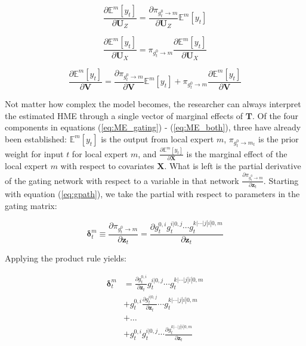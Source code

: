 \documentclass[12pt]{article}
\newcommand{\gateprod}[2]{\pi_{#1 \longrightarrow #2}}
\newcommand{\Eym}{\mathbb{E}^{m} \left[ y_{t} \right]}
\theoremstyle{definition}
\begin{document}
\begin{equation} \label{eq:ME_gating}
  \frac{\partial \Eym}{\partial \boldsymbol{U}_{Z}} = \frac{\partial \gateprod{g^{0}_{t}}{m}}{{\partial \boldsymbol{U}_{Z}}} \Eym
\end{equation}


\begin{equation} \label{eq:ME_expert}
  \frac{\partial \Eym}{\partial \boldsymbol{U}_{X}} = \gateprod{g^{0}_{t}}{m} \frac{\partial \Eym}{{\partial \boldsymbol{U}_{X}}}
\end{equation}


\begin{equation} \label{eq:ME_both}
  \frac{\partial \Eym}{\partial \boldsymbol{V}} = \frac{\partial \gateprod{g^{0}_{t}}{m}}{{\partial \boldsymbol{V}}} \Eym + \gateprod{g^{0}_{t}}{m} \frac{\partial \Eym}{{\partial \boldsymbol{V}}}
\end{equation}

Not matter how complex the model becomes, the researcher can always interpret
the estimated HME through a single vector of marginal effects of $\boldsymbol{T}$.
Of the four components in equations (\ref{eq:ME_gating}) - (\ref{eq:ME_both}),
three have already been established: $\Eym$ is the output from local
expert $m$, $\gateprod{g^{0}_{t}}{m_{t}}$ is the prior weight for
input $t$ for local expert $m$, and $\frac{\partial \Eym}{{\partial \boldsymbol{X}}}$
is the marginal effect of the local expert $m$ with respect to covariates $\boldsymbol{X}$.
What is left is the partial derivative of the gating network with respect to a
variable in that network $\frac{\partial \gateprod{g^{0}_{t}}{m}}{\partial \boldsymbol{z}_{t}}$.
Starting with equation (\ref{eq:gpath}), we take the partial with
respect to parameters in the gating matrix:

\begin{equation} \label{eq:hme_gate_marginal_effect_1}
  \boldsymbol{\delta}^{m}_{t} \equiv \frac{\partial \gateprod{g^{0}_{t}}{m}}{\partial \boldsymbol{z}_{t}} = \frac{\partial g^{0, i}_{t} g^{i|0, j}_{t} \cdots g^{k|\cdots|j|i|0, m}_{t}}{\partial \boldsymbol{z}_{t}}
\end{equation}

Applying the product rule yields:

\begin{equation} \label{eq:hme_gate_marginal_effect_2}
  \begin{split}
    \boldsymbol{\delta}^{m}_{t} &= \frac{\partial g^{0, i}_{t}}{\partial \boldsymbol{z}_{t}} g^{i|0, j}_{t} \cdots g^{k|\cdots|j|i|0, m}_{t}                       \\
                                     &+ g^{0, i}_{t} \frac{\partial g^{i|0, j}_{t}}{\partial \boldsymbol{z}_{t}} \cdots g^{k|\cdots|j|i|0, m}_{t} \\
                                     &+ \dots                                                                                     \\
                                     &+ g^{0, i}_{t} g^{i|0, j}_{t} \cdots \frac{\partial g^{k|\cdots|j|i|0, m}_{t}}{\partial \boldsymbol{z}_{t}} \\
  \end{split}
\end{equation}
\end{document}
